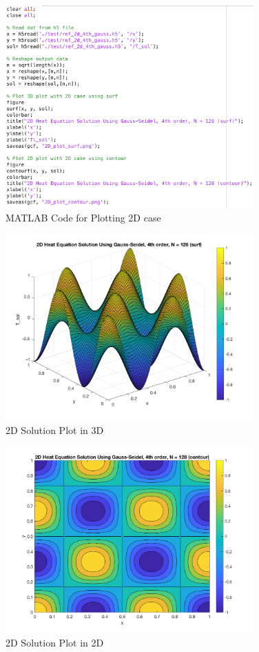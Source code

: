 \documentclass[a4paper]{article}
\begin{document}
\begin{figure}[htbp]
\centering
\includegraphics[width=0.85\textwidth]{mat.png}
\caption{\label{time_matlab}MATLAB Code for Plotting 2D case}
\end{figure}

\begin{figure}[htbp]
\centering
\includegraphics[width=0.85\textwidth]{2D_plot_surf.png}
\caption{\label{2dsurf}2D Solution Plot in 3D}
\end{figure}

\begin{figure}[htbp]
\centering
\includegraphics[width=0.85\textwidth]{2D_plot_contour.png}
\caption{\label{2dcontour}2D Solution Plot in 2D}
\end{figure}
\end{document}
